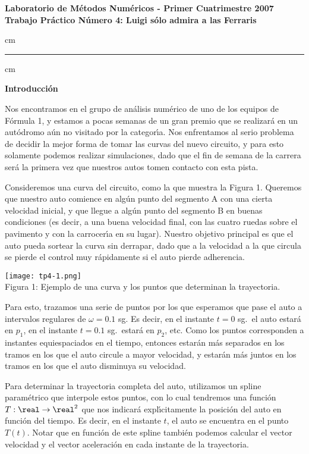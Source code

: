 
\begin{centering}
\bf Laboratorio de M\'etodos Num\'ericos - Primer Cuatrimestre 2007 \\
\bf Trabajo Pr\'actico N\'umero 4: Luigi s\'olo admira a las Ferraris \\
\end{centering}

 cm
\hrule
{} cm

\textbf{Introducci\'on}

Nos encontramos en el grupo de an\'alisis num\'erico de uno de los equipos de
F\'ormula 1, y estamos a pocas semanas de un gran premio que se realizar\'a
en un aut\'odromo a\'un no visitado por la categor\'\i a. Nos enfrentamos
al serio problema de decidir la mejor forma de tomar las curvas del nuevo
circuito, y para esto solamente podemos realizar simulaciones, dado que
el fin de semana de la carrera ser\'a la primera vez que nuestros autos
tomen contacto con esta pista.

Consideremos una curva del circuito, como la que muestra la Figura 1.
Queremos que nuestro auto comience en alg\'un punto del segmento A con
una cierta velocidad inicial, y que llegue a alg\'un punto del segmento B en
buenas condiciones (es decir, a una buena velocidad final, con las cuatro
ruedas sobre el pavimento y con la carrocer\'\i a en su lugar). Nuestro
objetivo principal es que el auto pueda sortear la curva sin derrapar, dado
que a la velocidad a la que circula se pierde el control muy r\'apidamente
si el auto pierde adherencia.

\vskip 11pt

\begin{centering}
\texttt{[image: tp4-1.png]} \\
Figura 1: Ejemplo de una curva y los puntos que determinan la trayectoria. \\
\end{centering}

\vskip 11pt

Para esto, trazamos una serie de puntos por los que esperamos que pase
el auto a intervalos regulares de $\omega = 0.1$ sg. Es decir, en el
instante $t=0$ sg.~el auto estar\'a en $p_1$, en el instante
$t=0.1$ sg.~estar\'a en $p_2$, etc. Como los puntos corresponden a
instantes equiespaciados en el tiempo, entonces estar\'an m\'as separados
en los tramos en los que el auto circule a mayor velocidad, y estar\'an
m\'as juntos en los tramos en los que el auto disminuya su velocidad.

Para determinar la trayectoria
completa del auto, utilizamos un spline param\'etrico que interpole estos
puntos, con lo cual tendremos una funci\'on $T:\real\to\real^2$ que nos
indicar\'a expl\'\i citamente la posici\'on del auto en funci\'on del tiempo.
Es decir, en el instante $t$, el auto se encuentra en el punto $T(t)$. Notar
que en funci\'on de este spline tambi\'en podemos calcular el vector velocidad y
el vector aceleraci\'on en cada instante de la trayectoria.

